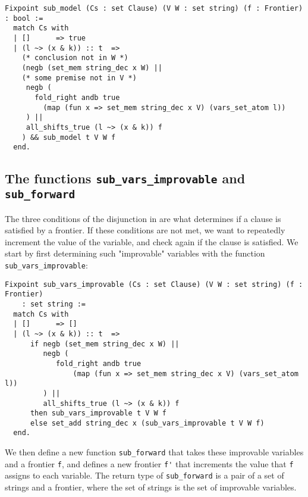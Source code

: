 \begin{minipage}{\linewidth}
\begin{lstlisting}[language=Coq, label={lst:sub_model_def}, caption={The function \lstinline{sub_model} in Coq}]
Fixpoint sub_model (Cs : set Clause) (V W : set string) (f : Frontier) : bool :=
  match Cs with
  | []      => true
  | (l ~> (x & k)) :: t  =>
    (* conclusion not in W *)
    (negb (set_mem string_dec x W) ||
    (* some premise not in V *)
     negb (
       fold_right andb true
         (map (fun x => set_mem string_dec x V) (vars_set_atom l))
     ) ||
     all_shifts_true (l ~> (x & k)) f
    ) && sub_model t V W f
  end.
\end{lstlisting}
\end{minipage}

\subsection{The functions \lstinline{sub_vars_improvable} and \lstinline{sub_forward}}

The three conditions of the disjunction in  are
what determines if a clause is satisfied by a frontier.
If these conditions are not met, we want to repeatedly increment the value of the variable,
and check again if the clause is satisfied.
We start by first determining such "improvable" variables with the function \lstinline{sub_vars_improvable}:

\begin{minipage}{\linewidth}
\begin{lstlisting}[language=Coq, label={lst:sub_vars_improvable_def}, caption={The function \lstinline{sub_vars_improvable} in Coq}]
Fixpoint sub_vars_improvable (Cs : set Clause) (V W : set string) (f : Frontier)
    : set string :=
  match Cs with
  | []      => []
  | (l ~> (x & k)) :: t  =>
      if negb (set_mem string_dec x W) ||
         negb (
            fold_right andb true
                (map (fun x => set_mem string_dec x V) (vars_set_atom l))
         ) ||
         all_shifts_true (l ~> (x & k)) f
      then sub_vars_improvable t V W f
      else set_add string_dec x (sub_vars_improvable t V W f)
  end.
\end{lstlisting}
\end{minipage}

We then define a new function \lstinline{sub_forward} that takes these improvable variables
and a frontier \lstinline{f}, and defines a new frontier \lstinline{f'}
that increments the value that \lstinline{f} assigns to each variable.
The return type of \lstinline{sub_forward} is a pair of a set of strings and a frontier,
where the set of strings is the set of improvable variables.

